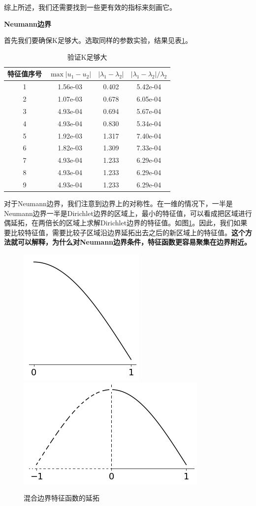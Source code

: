 \documentclass[12pt,a4paper]{article}
\begin{document}
综上所述，我们还需要找到一些更有效的指标来刻画它。

\textbf{Neumann边界}

首先我们要确保K足够大。选取同样的参数实验，结果见表\ref{kN}。

\begin{table}
\centering
\begin{tabular}{c|c|c|c}
\hline
特征值序号 & $\max |u_1 - u_2|$ & $|\lambda_1 - \lambda_2|$ & $|\lambda_1 - \lambda_2| / \lambda_2$ \\
\hline
1 & 1.56e-03 & 0.402 & 5.42e-04 \\
2 & 1.07e-03 & 0.678 & 6.05e-04 \\
3 & 4.93e-04 & 0.694 & 5.67e-04 \\
4 & 4.93e-04 & 0.830 & 5.34e-04 \\
5 & 1.92e-03 & 1.317 & 7.40e-04 \\
6 & 1.82e-03 & 1.309 & 7.33e-04 \\
7 & 4.93e-04 & 1.233 & 6.29e-04 \\
8 & 4.93e-04 & 1.233 & 6.29e-04 \\
9 & 4.93e-04 & 1.233 & 6.29e-04 \\
\hline 
\end{tabular}
\caption{验证K足够大}
\label{kN}
\end{table}

对于Neumann边界，我们注意到边界上的对称性。在一维的情况下，一半是Neumann边界一半是Dirichlet边界的区域上，最小的特征值，可以看成把区域进行偶延拓，在两倍长的区域上求解Dirichlet边界的特征值。如图\ref{expand}。因此，我们如果要比较特征值，需要比较子区域沿边界延拓出去之后的新区域上的特征值。\textbf{这个方法就可以解释，为什么对Neumann边界条件，特征函数更容易聚集在边界附近。}

\begin{figure}[htbp]
\centering
\includegraphics[height=0.15\textheight]{locate/DN}
\includegraphics[height=0.15\textheight]{locate/DD}
\caption{混合边界特征函数的延拓}
\label{expand}
\end{figure}
\end{document}
